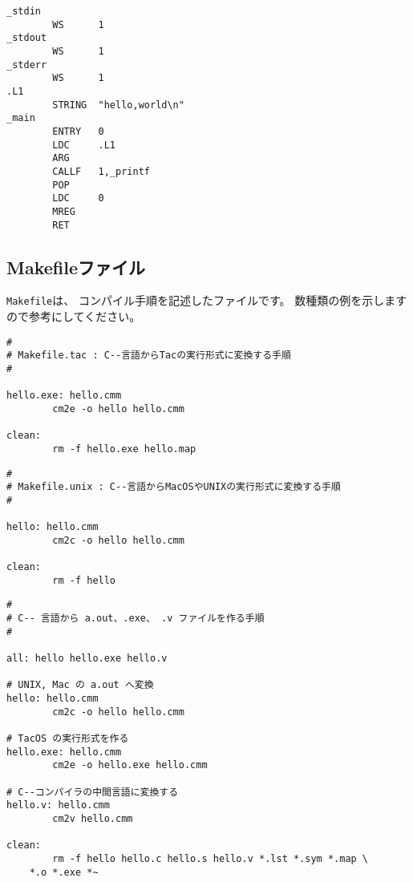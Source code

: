 \begin{itemize}
\begin{mylist}
\begin{verbatim}
_stdin
        WS      1
_stdout
        WS      1
_stderr
        WS      1
.L1
        STRING  "hello,world\n"
_main
        ENTRY   0
        LDC     .L1
        ARG
        CALLF   1,_printf
        POP
        LDC     0
        MREG
        RET
\end{verbatim}
\end{mylist}
\end{itemize}

\subsection{Makefileファイル}

{\tt Makefile}は、
コンパイル手順を記述したファイルです。
数種類の例を示しますので参考にしてください。

\begin{mylist}
\begin{verbatim}
#
# Makefile.tac : C--言語からTacの実行形式に変換する手順
#

hello.exe: hello.cmm
        cm2e -o hello hello.cmm

clean:
        rm -f hello.exe hello.map
\end{verbatim}
\end{mylist}

\begin{mylist}
\begin{verbatim}
#
# Makefile.unix : C--言語からMacOSやUNIXの実行形式に変換する手順
#

hello: hello.cmm
        cm2c -o hello hello.cmm

clean:
        rm -f hello
\end{verbatim}
\end{mylist}

\begin{mylist}
\begin{verbatim}
#
# C-- 言語から a.out、.exe、 .v ファイルを作る手順
#

all: hello hello.exe hello.v

# UNIX, Mac の a.out へ変換
hello: hello.cmm
        cm2c -o hello hello.cmm

# TacOS の実行形式を作る
hello.exe: hello.cmm
        cm2e -o hello.exe hello.cmm

# C--コンパイラの中間言語に変換する
hello.v: hello.cmm
        cm2v hello.cmm

clean:
        rm -f hello hello.c hello.s hello.v *.lst *.sym *.map \
	*.o *.exe *~

\end{verbatim}
\end{mylist}
